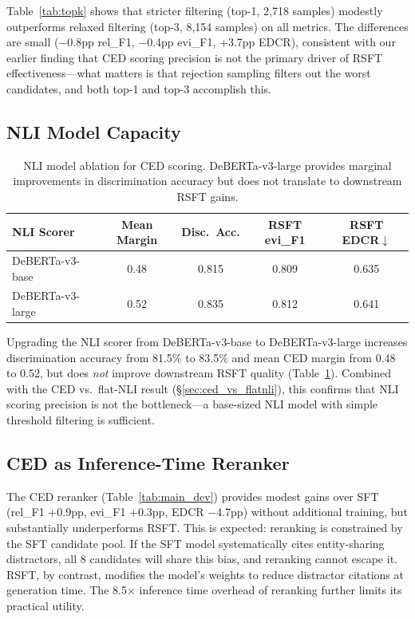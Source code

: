 \documentclass[11pt,a4paper]{article}
\begin{document}
Table~\ref{tab:topk} shows that stricter filtering (top-1, 2,718 samples) modestly outperforms relaxed filtering (top-3, 8,154 samples) on all metrics.
The differences are small ($-$0.8pp rel\_F1, $-$0.4pp evi\_F1, +3.7pp EDCR), consistent with our earlier finding that CED scoring precision is not the primary driver of RSFT effectiveness---what matters is that rejection sampling filters out the worst candidates, and both top-1 and top-3 accomplish this.

\subsection{NLI Model Capacity}

\begin{table}[t]
\centering
\caption{NLI model ablation for CED scoring. DeBERTa-v3-large provides marginal improvements in discrimination accuracy but does not translate to downstream RSFT gains.}
\label{tab:nli_ablation}
\small
\begin{tabular}{lcccc}
\toprule
\textbf{NLI Scorer} & \textbf{Mean Margin} & \textbf{Disc.\ Acc.} & \textbf{RSFT evi\_F1} & \textbf{RSFT EDCR}$\downarrow$ \\
\midrule
DeBERTa-v3-base  & 0.48 & 0.815 & 0.809 & 0.635 \\
DeBERTa-v3-large & 0.52 & 0.835 & 0.812 & 0.641 \\
\bottomrule
\end{tabular}
\end{table}

Upgrading the NLI scorer from DeBERTa-v3-base to DeBERTa-v3-large increases discrimination accuracy from 81.5\% to 83.5\% and mean CED margin from 0.48 to 0.52, but does \emph{not} improve downstream RSFT quality (Table~\ref{tab:nli_ablation}).
Combined with the CED vs.\ flat-NLI result (\S\ref{sec:ced_vs_flatnli}), this confirms that NLI scoring precision is not the bottleneck---a base-sized NLI model with simple threshold filtering is sufficient.

\subsection{CED as Inference-Time Reranker}

The CED reranker (Table~\ref{tab:main_dev}) provides modest gains over SFT (rel\_F1 +0.9pp, evi\_F1 +0.3pp, EDCR $-$4.7pp) without additional training, but substantially underperforms RSFT.
This is expected: reranking is constrained by the SFT candidate pool.
If the SFT model systematically cites entity-sharing distractors, all 8 candidates will share this bias, and reranking cannot escape it.
RSFT, by contrast, modifies the model's weights to reduce distractor citations at generation time.
The 8.5$\times$ inference time overhead of reranking further limits its practical utility.
\end{document}
